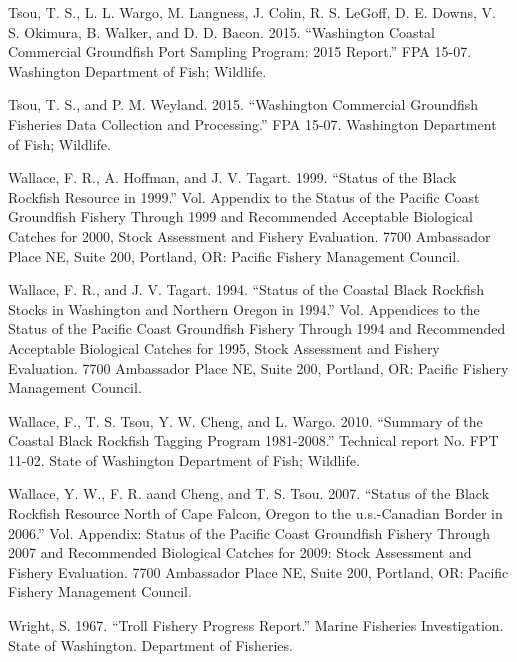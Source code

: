\documentclass[11pt,
  english,
  letterpaper,
]{article}
\newlength{\cslhangindent}
\newenvironment{CSLReferences}[2] %
 {%
  \setlength{\parindent}{0pt}
  \ifodd #1 \everypar{\setlength{\hangindent}{\cslhangindent}}\ignorespaces\fi
  \ifnum #2 > 0
  \setlength{\parskip}{#2\baselineskip}
  \fi
 }%
 {}
\begin{document}
\begin{CSLReferences}{1}{0}
\leavevmode{}%
Tsou, T. S., L. L. Wargo, M. Langness, J. Colin, R. S. LeGoff, D. E. Downs, V. S. Okimura, B. Walker, and D. D. Bacon. 2015. {``Washington Coastal Commercial Groundfish Port Sampling Program: 2015 Report.''} FPA 15-07. Washington Department of Fish; Wildlife.

\leavevmode{}%
Tsou, T. S., and P. M. Weyland. 2015. {``Washington Commercial Groundfish Fisheries Data Collection and Processing.''} FPA 15-07. Washington Department of Fish; Wildlife.

\leavevmode{}%
Wallace, F. R., A. Hoffman, and J. V. Tagart. 1999. {``Status of the Black Rockfish Resource in 1999.''} Vol. Appendix to the Status of the Pacific Coast Groundfish Fishery Through 1999 and Recommended Acceptable Biological Catches for 2000, Stock Assessment and Fishery Evaluation. 7700 Ambassador Place NE, Suite 200, Portland, OR: Pacific Fishery Management Council.

\leavevmode{}%
Wallace, F. R., and J. V. Tagart. 1994. {``Status of the Coastal Black Rockfish Stocks in Washington and Northern Oregon in 1994.''} Vol. Appendices to the Status of the Pacific Coast Groundfish Fishery Through 1994 and Recommended Acceptable Biological Catches for 1995, Stock Assessment and Fishery Evaluation. 7700 Ambassador Place NE, Suite 200, Portland, OR: Pacific Fishery Management Council.

\leavevmode{}%
Wallace, F., T. S. Tsou, Y. W. Cheng, and L. Wargo. 2010. {``Summary of the Coastal Black Rockfish Tagging Program 1981-2008.''} Technical report No. FPT 11-02. State of Washington Department of Fish; Wildlife.

\leavevmode{}%
Wallace, Y. W., F. R. aand Cheng, and T. S. Tsou. 2007. {``Status of the Black Rockfish Resource North of Cape Falcon, Oregon to the u.s.-Canadian Border in 2006.''} Vol. Appendix: Status of the Pacific Coast Groundfish Fishery Through 2007 and Recommended Biological Catches for 2009: Stock Assessment and Fishery Evaluation. 7700 Ambassador Place NE, Suite 200, Portland, OR: Pacific Fishery Management Council.

\leavevmode{}%
Wright, S. 1967. {``Troll Fishery Progress Report.''} Marine Fisheries Investigation. State of Washington. Department of Fisheries.

\end{CSLReferences}
\end{document}
